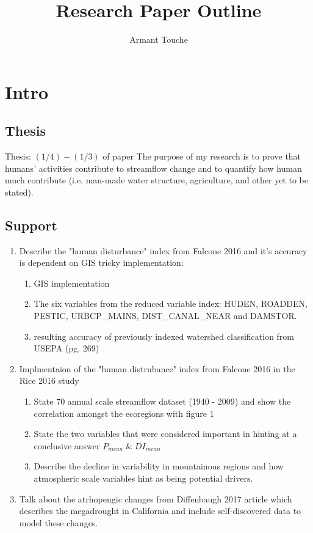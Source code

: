 \documentclass{article}
\begin{document}
\title{\vspace{-2cm}Research Paper Outline}
\author{Armant Touche}
\maketitle

\section{Intro}

    \subsection{Thesis} Thesis: $(1/4) - (1/3)$ of paper The purpose of my research is to prove that humans' activities contribute to streamflow change and to quantify how human much contribute (i.e. man-made water structure, agriculture, and other yet to be stated).

    \subsection{Support}
    \begin{enumerate}
        \item Describe the "human disturbance" index from Falcone 2016 and it's accuracy is dependent on GIS tricky implementation:
            \begin{enumerate}
                \item GIS implementation
                \item The six variables from the reduced variable index: HUDEN, ROADDEN, PESTIC, URBCP\_MAINS, DIST\_CANAL\_NEAR and DAMSTOR. 
                \item resulting accuracy of previously indexed watershed classification from USEPA (pg. 269)
            \end{enumerate}

        \item Implmentaion of the "human distrubance" index from Falcone 2016 in the Rice 2016 study
            \begin{enumerate}
                \item State 70 annual scale streamflow dataset (1940 - 2009) and show the correlation amongst the ecoregions with figure 1
                \item State the two variables that were considered important in hinting at a conclusive answer $P_\textit{mean} \;\&\; {DI}_\textit{mean}$ 
                \item Describe the decline in variability in mountainous regions and how atmospheric scale variables hint as being potential drivers. 
            \end{enumerate}

        \item Talk about the atrhopengic changes from Diffenbaugh 2017 article which describes the megadrought in California and include self-discovered data to model these changes.


    \end{enumerate}
\end{document}
